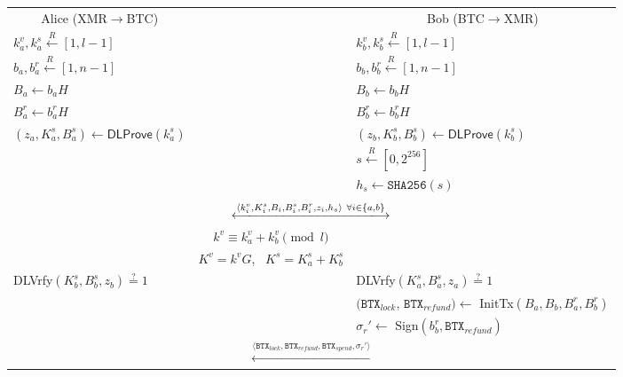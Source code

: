 \documentclass{llncs}
\renewcommand{\arraystretch}{1.5}
\newcommand{\BTX}{\texttt{BTX}}
\newcommand{\Sign}{\textsf{Sign}}
\newcommand{\DLProve}{\textsf{DLProve}}
\newcommand{\DLVrfy}{\textsf{DLVrfy}}
\newcommand{\InitTx}{\textsf{InitTx}}
\begin{document}
\newpage

\begin{figure}[H]
    \begin{table}[H]
        \centering
      {\renewcommand{\arraystretch}{1.1}%
      \begin{tabular}{ | l c l | }
        \hline
          \multicolumn{1}{|c}{Alice (XMR$\rightarrow$BTC)} &  & \multicolumn{1}{c|}{Bob (BTC$\rightarrow$XMR)} \\
          $k^v_a, k^s_a \xleftarrow{R} [1, l-1]$ & & $k^v_b, k^s_b \xleftarrow{R} [1, l-1]$ \\
          $b_a,b^r_a \xleftarrow{R} [1, n-1]$ & & $b_b,b^r_b \xleftarrow{R} [1, n-1]$ \\
          $B_a \leftarrow b_aH$ & & $B_b \leftarrow b_bH$ \\
          $B^r_a \leftarrow b^r_aH$ & & $B^r_b \leftarrow b^r_bH$ \\
          $(z_a, K^s_a, B^s_a) \leftarrow \DLProve(k^s_a)$ & & $(z_b, K^s_b, B^s_b) \leftarrow \DLProve(k^s_b)$ \\
          & & $s \xleftarrow{R} [0, 2^{256}]$ \\
          & & $h_s \gets \texttt{SHA256}(s)$ \\
           & & \\

          \multicolumn{3}{|c|}{$\xlongleftrightarrow{\langle k^v_i, K^s_i, B_i, B^s_i, B^r_i, z_i, h_s \rangle \  \forall i \in \{a, b\}}$} \\

          & $k^v \equiv k^v_a + k^v_b \pmod l$ & \\
          & $K^v = k^vG$, \ $K^s = K^s_a + K^s_b$ & \\

          \DLVrfy$(K^s_b, B^s_b, z_b) \stackrel{?}{=} 1$ & & \DLVrfy$(K^s_a, B^s_a, z_a) \stackrel{?}{=} 1$ \\
          & & $(\BTX_\textit{lock}$, $\BTX_\textit{refund}) \gets$ \InitTx$(B_a, B_b, B^r_a, B^r_b)$ \\
          & & $\sigma_r' \gets$ \Sign$(b^r_b, \BTX_\textit{refund})$ \\

          \multicolumn{3}{|c|}{$\xleftarrow{\langle \BTX_\textit{lock}, \BTX_\textit{refund}, \BTX_\textit{spend}, \sigma_r' \rangle}$} \\


\end{tabular}}
\end{table}
\end{figure}
\end{document}
